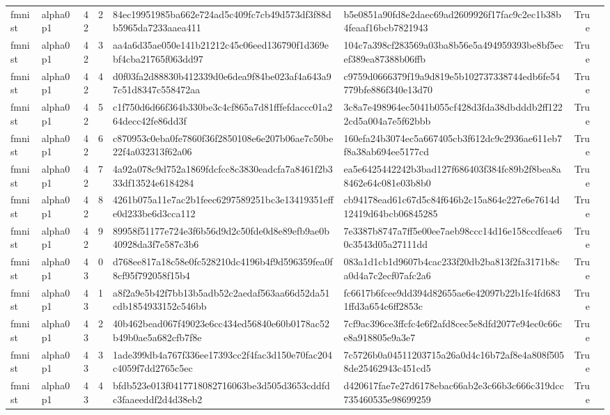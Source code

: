 \begin{tabular}{llrrllrl}
fmnist & alpha0p1 & 42 & 2 & 84ec19951985ba662e724ad5c409fc7cb49d573df3f88db5965da7233aaea411 & b5e0851a90fd8e2daec69ad2609926f17fac9c2ec1b38b4feaaf16bcb7821943 & True &  \\
fmnist & alpha0p1 & 42 & 3 & aa4a6d35ae050e141b21212c45c06eed136790f1d369ebf4cba21765f063dd97 & 104c7a398cf283569a03ba8b56e5a494959393be8bf5ecef389ea87388b06ffb & True &  \\
fmnist & alpha0p1 & 42 & 4 & d0f03fa2d88830b412339d0e6dea9f84be023af4a643a97c51d8347c558472aa & c9759d0666379f19a9d819e5b102737338744edb6fe54779bfe886f340e13d70 & True &  \\
fmnist & alpha0p1 & 42 & 5 & c1f750d6d66f364b330be3c4cf865a7d81fffefdaccc01a264decc42fe86dd3f & 3c8a7e498964ec5041b055cf428d3fda38dbdddb2ff1222cd5a004a7e5f62bbb & True &  \\
fmnist & alpha0p1 & 42 & 6 & c870953c0eba0fe7860f36f2850108e6e207b06ae7c50be22f4a032313f62a06 & 160efa24b3074ec5a667405cb3f612dc9c2936ae611eb7f8a38ab694ee5177cd & True &  \\
fmnist & alpha0p1 & 42 & 7 & 4a92a078c9d752a1869fdcfcc8c3830eadcfa7a8461f2b333df13524e6184284 & ea5e6425442242b3bad127f686403f384fc89b2f8bea8a8462e64c081e03b8b0 & True &  \\
fmnist & alpha0p1 & 42 & 8 & 4261b075a11e7ac2b1feec6297589251bc3e13419351effe0d233be6d3cca112 & cb94178ead61c67d5c84f646b2c15a864e227e6e7614d12419d64bcb06845285 & True &  \\
fmnist & alpha0p1 & 42 & 9 & 89958f51177e724e3f6b56d9d2c50fde0d8e89efb9ae0b40928da3f7e587c3b6 & 7e3387b8747a7ff5e00ee7aeb98ccc14d16e158ccdfeae60c3543d05a27111dd & True &  \\
fmnist & alpha0p1 & 43 & 0 & d768ee817a18c58e0fc528210dc4196b4f9d596359fea0f8cf95f792058f15b4 & 083a1d1cb1d9607b4cac233f20db2ba813f2fa3171b8ca0d4a7c2ecf07afc2a6 & True &  \\
fmnist & alpha0p1 & 43 & 1 & a8f2a9e5b42f7bb13b5adb52c2aedaf563aa66d52da51cdb1854933152c546bb & fc6617b6fcee9dd394d82655ae6e42097b22b1fe4fd6831ffd3a654c6ff2853c & True &  \\
fmnist & alpha0p1 & 43 & 2 & 40b462bead067f49023e6cc434ed56840e60b0178ac52b49b0ae5a682cfb7f8e & 7cf9ac396ce3ffcfc4e6f2afd8cec5e8dfd2077e94ec0c66ce8a918805e9a3e7 & True &  \\
fmnist & alpha0p1 & 43 & 3 & 1ade399db4a767f336ee17393cc2f4fac3d150e70fac204c4059f7dd2765c5ec & 7c5726b0a04511203715a26a0d4c16b72af8e4a808f5058de25462943c451cd5 & True &  \\
fmnist & alpha0p1 & 43 & 4 & bfdb523e013f0417718082716063be3d505d3653cddfdc3faaeeddf2d4d38eb2 & d420617fae7e27d6178ebac66ab2e3c66b3c666c319dcc735460535e98699259 & True &  \\

\end{tabular}
